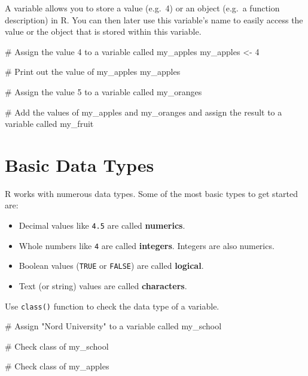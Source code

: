 \documentclass[
  12pt,
  a4paper,
]{scrbook}
\newenvironment{Shaded}{\begin{snugshade}}{\end{snugshade}}
\newcommand{\CommentTok}[1]{\textcolor[rgb]{0.37,0.37,0.37}{#1}}
\newcommand{\DecValTok}[1]{\textcolor[rgb]{0.68,0.00,0.00}{#1}}
\newcommand{\NormalTok}[1]{\textcolor[rgb]{0.00,0.23,0.31}{#1}}
\newcommand{\OtherTok}[1]{\textcolor[rgb]{0.00,0.23,0.31}{#1}}
\providecommand{\tightlist}{%
  \setlength{\itemsep}{0pt}\setlength{\parskip}{0pt}}
\renewcommand{\tightlist}{\setlength{\itemsep}{0.5\baselineskip}\setlength{\parskip}{0.2\baselineskip}}
\theoremstyle{plain}
\theoremstyle{definition}
\theoremstyle{remark}
\begin{document}
A variable allows you to store a value (e.g.~4) or an object (e.g.~a
function description) in R. You can then later use this variable's name
to easily access the value or the object that is stored within this
variable.

\begin{Shaded}
\begin{Highlighting}[]
\CommentTok{\# Assign the value 4 to a variable called my\_apples}
\NormalTok{my\_apples }\OtherTok{\textless{}{-}} \DecValTok{4}

\CommentTok{\# Print out the value of my\_apples}
\NormalTok{my\_apples}
\end{Highlighting}
\end{Shaded}

\begin{Shaded}
\begin{Highlighting}[]
\CommentTok{\# Assign the value 5 to a variable called my\_oranges}

\CommentTok{\# Add the values of my\_apples and my\_oranges and assign the result to a variable called my\_fruit}
\end{Highlighting}
\end{Shaded}

\section{Basic Data Types}\label{basic-data-types}

R works with numerous data types. Some of the most basic types to get
started are:

\begin{itemize}
\tightlist
\item
  Decimal values like \texttt{4.5} are called \textbf{numerics}.
\item
  Whole numbers like \texttt{4} are called \textbf{integers}. Integers
  are also numerics.
\item
  Boolean values (\texttt{TRUE} or \texttt{FALSE}) are called
  \textbf{logical}.
\item
  Text (or string) values are called \textbf{characters}.
\end{itemize}

Use \texttt{class()} function to check the data type of a variable.

\begin{Shaded}
\begin{Highlighting}[]
\CommentTok{\# Assign "Nord University" to a variable called my\_school}

\CommentTok{\# Check class of my\_school}

\CommentTok{\# Check class of my\_apples}
\end{Highlighting}
\end{Shaded}
\end{document}
